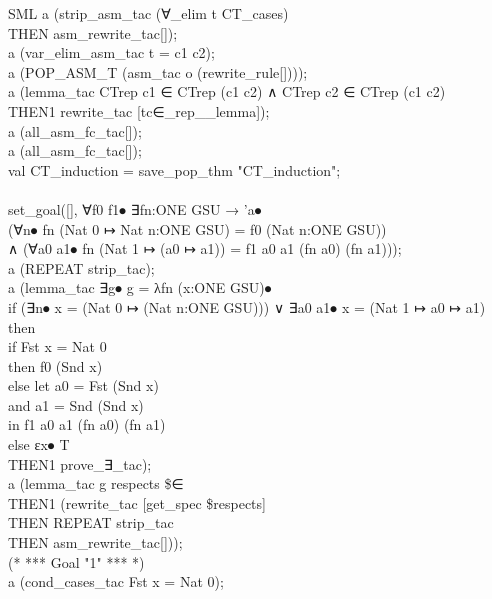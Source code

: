 {\begin{GFT}{SML}
\+a (strip\_asm\_tac (∀\_elim \PrKM{}t\PrKO{} CT\_cases)\\
\+	THEN asm\_rewrite\_tac[]);\\
\+a (var\_elim\_asm\_tac \PrKM{}t = c1  c2\PrKO{});\\
\+a (POP\_ASM\_T (asm\_tac o (rewrite\_rule[])));\\
\+a (lemma\_tac \PrKM{}CTrep c1 ∈\PrJL{+} CTrep (c1  c2) ∧ CTrep c2 ∈\PrJL{+} CTrep (c1  c2)\PrKO{}\\
\+	THEN1 rewrite\_tac [tc∈\_rep\_\_lemma]);\\
\+a (all\_asm\_fc\_tac[]);\\
\+a (all\_asm\_fc\_tac[]);\\
\+val CT\_induction = save\_pop\_thm "CT\_induction";\\
\+\\
\+set\_goal([], \PrKM{}∀f0 f1⦁ ∃fn:ONE GSU → 'a⦁\\
\+	(∀n⦁ fn (Nat 0 ↦ Nat n:ONE GSU) = f0 (Nat n:ONE GSU))\\
\+	∧ (∀a0 a1⦁ fn (Nat 1 ↦ (a0 ↦ a1)) = f1 a0 a1 (fn a0) (fn a1))\PrKO{});\\
\+a (REPEAT strip\_tac);\\
\+a (lemma\_tac \PrKM{}∃g⦁ g = λfn (x:ONE GSU)⦁\\
\+  if (∃n⦁ x = (Nat 0 ↦ (Nat n:ONE GSU))) ∨ ∃a0 a1⦁ x = (Nat 1 ↦ a0 ↦ a1)\\
\+  then\\
\+	if Fst x = Nat 0\\
\+	then f0 (Snd x)\\
\+	else	let a0 = Fst (Snd x)\\
\+		and a1 = Snd (Snd x)\\
\+		in f1 a0 a1 (fn a0) (fn a1)\\
\+  else εx⦁ T\PrKO{}\\
\+	THEN1 prove\_∃\_tac);\\
\+a (lemma\_tac \PrKM{}g respects \$∈\PrKO{}\\
\+	THEN1 (rewrite\_tac [get\_spec \PrKM{}\$respects\PrKO{}]\\
\+		THEN REPEAT strip\_tac\\
\+		THEN asm\_rewrite\_tac[]));\\
\+(* *** Goal "1" *** *)\\
\+a (cond\_cases\_tac \PrKM{}Fst x = Nat 0\PrKO{});\\

\end{GFT}}
